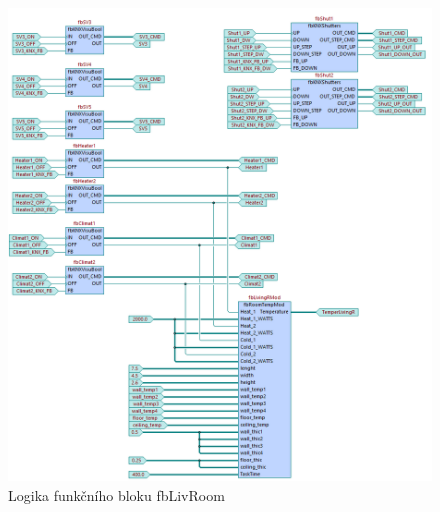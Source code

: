 \begin{figure}[!ht]
  \begin{center}
  \includegraphics[scale=0.58]{obrazky/fbLivRoom.png}
  \end{center}
  \caption[Logika funkčního bloku fbLivRoom]{Logika funkčního bloku fbLivRoom}
  \label{fig:fbLivRoom}
\end{figure}
\pagebreak

